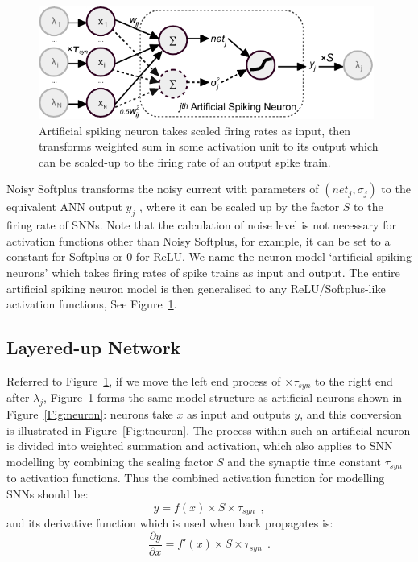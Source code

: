 	\begin{figure}[bt!]
		\centering
		\includegraphics[width=0.98\textwidth]{pics_iconip/neuron_o.pdf}
		\caption{Artificial spiking neuron takes scaled firing rates as input, then transforms weighted sum in some activation unit to its output which can be scaled-up to the firing rate of an output spike train.}
		\label{Fig:sneuron}
	\end{figure}
	
	Noisy Softplus transforms the noisy current with parameters of $(net_j, \sigma_j)$ to the equivalent ANN output $y_j$ , where it can be scaled up by the factor $S$ to the firing rate of SNNs.
	Note that the calculation of noise level is not necessary for activation functions other than Noisy Softplus, for example, it can be set to a constant for Softplus or 0 for ReLU.
	We name the neuron model `artificial spiking neurons' which takes firing rates of spike trains as input and output. 
	The entire artificial spiking neuron model is then generalised to any ReLU/Softplus-like activation functions, See Figure~\ref{Fig:sneuron}.
	

	
	
	\subsection{Layered-up Network}
	\label{subsec:ns_train}
	Referred to Figure~\ref{Fig:sneuron}, if we move the left end process of $\times \tau_{syn}$ to the right end after $\lambda_j$, Figure~\ref{Fig:sneuron} forms the same model structure as artificial neurons shown in Figure~\ref{Fig:neuron}: neurons take $x$ as input and outputs $y$, and this conversion is illustrated in Figure~\ref{Fig:tneuron}.
	The process within such an artificial neuron is divided into weighted summation and activation, which also applies to SNN modelling by combining the scaling factor $S$ and the synaptic time constant $\tau_{syn}$ to activation functions.
	Thus the combined activation function for modelling SNNs should be:
	\begin{equation}
	y = f(x) \times S \times \tau_{syn}~~,
	\label{equ:full_act}
	\end{equation}
	and its derivative function which is used when back propagates is:
	\begin{equation}
	\frac{\partial y}{\partial x} = f'(x) \times S \times \tau_{syn}~~.
	\end{equation}
	
